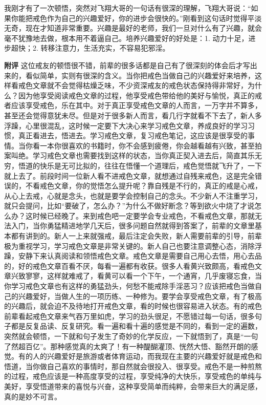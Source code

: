 \begin{case}
    我刚才有了一次顿悟，突然对飞翔大哥的一句话有很深的理解，飞翔大哥说：“如果你能把戒色作为自己的兴趣爱好，你的进步会很快的。”刚看到这句话时觉得平淡无奇，现在才知道非常重要。兴趣是最好的老师，我们一旦对什么有了兴趣，就会毫不犹豫地去做，根本用不着逼自己。培养兴趣爱好的好处是：1. 动力十足，进步超快；2. 转移注意力，生活充实，不容易犯邪淫。

    \textbf{附评} 这位戒友的顿悟很不错，前辈的很多话都是自己有了很深刻的体会后才写出来的，看似简单，实则有很深的含义。当你把戒色当做自己的兴趣爱好来培养，这样看戒色文章就不会觉得枯燥乏味，不少资深戒友的戒色状态保持得非常好，为什么？因为他享受阅读戒色文章的过程，他享受戒色带给他的美好与愉悦，真正的戒者应该享受戒色，乐在其中。对于真正享受戒色文章的人而言，一万字并不算多，甚至还会觉得意犹未尽。但是对于很多新人而言，看几行字就看不下去了，新人多浮躁，心里很混乱，这时候一定要下大决心来学习戒色文章，养成良好的学习习惯，真正看进去，悟进去。学习戒色文章，复习戒色笔记，这应该是很享受的事情。当你看一本你很喜欢的书籍时，你不会感到疲倦，你会越看越有兴致，甚至拍案叫绝。学习戒色文章也需要找到这样的状态，当你真正契入进去后，简直其乐无穷，悟道的快乐是无可比拟的，往往在悟懂一个道理后，戒色觉悟就飞升了，一下就上去了。前段时间一位新人看不进戒色文章，就想通过自残来戒色，这是完全错误的，不看戒色文章，你的觉悟怎么提升呢？靠自残是不行的，真正的戒是心戒，从心上去戒，心就是念头，也就是要学会控制自己的念头。不少新人不注重学习，就只会提问，比如“要破了，怎么办？”为什么不做好断念？等到欲火中烧了才说怎么办？这时候已经晚了。来到戒色吧一定要学会专业戒色，不看戒色文章，那就无法入门，当你勇猛精进地学几天后，很多问题自然就得到答案了，前辈的文章里基本都有讲到的。新人一上来就强戒，最后注定会失败，新人需要前辈的引导，前辈极为重视学习，学习戒色文章是非常关键的。新人自己也要注意调整心态，消除浮躁，安静下来认真阅读和领悟戒色文章。戒色文章是需要自己用心去悟，用心去品的，好的戒色文章百看不厌，每看一遍都有收获。很多人看黄兴致颇高，看戒色文章兴致寥寥，这样就难戒了，看黄可以看一个下午，一个通宵，几乎废寝忘食，当你学习戒色文章也有这样的勇猛劲头，何愁不能戒除手淫恶习？应该把戒色当做自己的兴趣爱好，当做人生的一项历练、一种修为。要学会享受戒色文章，有了极高的兴趣后，就会迫不及待地打开戒色文章，看的时候也很容易进入状态。有的戒色前辈看起戒色文章来气吞万里如虎，学习的劲头很足，不愿错过每一句话，很多句子都是反复品读、反复研究。看一遍和看十遍的感觉是不同的，看到一定的遍数，突然就会顿悟，一下就和句子发生了奇妙的化学反应，一下就悟到了，真是“一句了然超百亿”。那种感觉真的太爽了！有一种醍醐灌顶、恍然大悟、豁然开朗的感觉。有的人的兴趣爱好是旅游或者体育运动，而我现在主要的兴趣爱好就是戒色和悟道，当你做自己喜欢的事情时，那自然就会很投入、很享受。戒色不是一种煎熬的过程，戒色应该是一种高度享受的过程，享受纯净的大快乐，享受戒色的单纯与美好，享受悟道带来的喜悦与兴奋，这种享受简单而纯粹，会带来巨大的满足感，真的是妙不可言。
\end{case}

